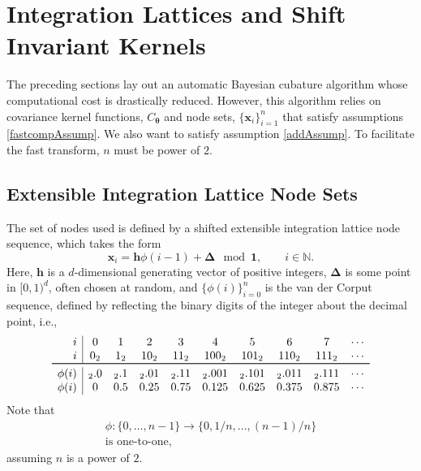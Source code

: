 \documentclass[twocolumn]{svjour3}          %
\newcommand{\bm}[1]{\boldsymbol{#1}}
\newcommand{\naturals}{\mathbb{N}}
\newcommand{\vDelta}{{\boldsymbol{\Delta}}}
\newcommand{\vtheta}{{\bm{\theta}}}
\newcommand{\vh}{\bm{h}}
\newcommand{\vx}{\bm{x}}
\newcommand{\vone}{\bm{1}}
\begin{document}
\section{Integration Lattices and Shift Invariant Kernels}
\label{sec:shift_invariant_kernel}

The preceding sections lay out an automatic Bayesian cubature algorithm whose computational cost is drastically reduced.  However, this algorithm relies on covariance kernel functions, $C_\vtheta$ and node sets, $\{\vx_i\}_{i=1}^n$ that satisfy assumptions \eqref{fastcompAssump}.  We  also want to satisfy assumption \eqref{addAssump}.  
To facilitate the fast transform, $n$ must be power of $2$.  

\subsection{Extensible Integration Lattice Node Sets}

The set of nodes used is defined by a shifted extensible integration lattice node sequence, which takes the form
\begin{equation} \label{eqn:lattice_def}
\vx_{i} = \vh \phi(i-1) + \vDelta \mod \vone, \qquad i \in \naturals.
\end{equation} 
Here, $\vh$ is a $d$-dimensional generating vector of positive integers, $\vDelta$ is some point in $[0,1)^d$, often chosen at random, and $\{\phi(i)\}_{i=0}^n$ is the van der Corput sequence, defined by reflecting the binary digits of the integer about the decimal point, i.e., 
\begin{align} \label{vdCDef}
\begin{array}{r|ccccccccccccc}
i & 0 & 1 & 2 & 3 & 4 &  5 & 6 & 7 & \cdots \\
i & 0_2 & 1_2 & 10_2 & 11_2 & 100_2 & 101_2 & 110_2 & 111_2  & \cdots\\
\toprule
\phi(i) & {}_2.0 &  {}_2.1 & {}_2.01 &  {}_2.11  & {}_2.001 &  {}_2.101 & {}_2.011 &  {}_2.111 & \cdots\\
\phi(i) & 0 &  0.5 &  0.25 & 0.75 &  0.125 & 0.625  &  0.375 & 0.875 & \cdots
\end{array}
\end{align}
Note that 
\begin{multline} \label{phiprop}
\phi:\{0, \ldots, n-1 \} \to \{0, 1/n, \ldots, (n-1)/n\} \\
\text{is one-to-one},
\end{multline}
assuming $n$ is a power of $2$.
\end{document}
